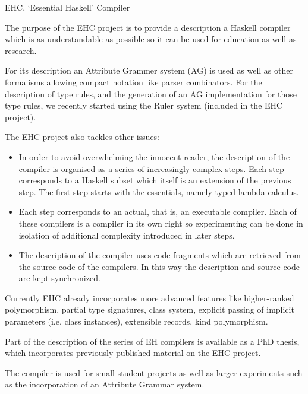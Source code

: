 \begin{hcarentry}{EHC, `Essential Haskell' Compiler}
\label{ehc}
\makeheader

The purpose of the EHC project is to provide a description a Haskell compiler
which is as understandable as possible so it can be used for education as well
as research.

For its description an Attribute Grammer system (AG) is used
as well as other formalisms allowing compact notation like parser combinators.
For the description of type rules,
and the generation of an AG implementation for those type rules,
we recently started using the Ruler system (included in the EHC project).

The EHC project also tackles other issues:
\begin{itemize}
\item
   In order to avoid overwhelming the innocent reader,
   the description of the compiler is organised as a series of
   increasingly complex steps.
   Each step corresponds to a Haskell subset which itself is an extension
   of the previous step.
   The first step starts with the essentials, namely typed lambda
   calculus.

\item
   Each step corresponds to an actual, that is, an executable compiler.
   Each of these compilers is a compiler in its own right so
   experimenting can be done in isolation of additional complexity
   introduced in later steps.

\item
   The description of the compiler uses code fragments which are
   retrieved from the source code of the compilers.
   In this way the description and source code are kept synchronized.
\end{itemize}

Currently EHC already incorporates more advanced features like
higher-ranked polymorphism, partial type signatures, class system,
explicit passing of implicit parameters (i.e. class instances),
extensible records, kind polymorphism.

Part of the description of the series of EH compilers is available as a PhD thesis,
which incorporates previously published material on the EHC project.

The compiler is used for small student projects as well as larger
experiments such as the incorporation of an Attribute Grammar system.


\end{hcarentry}
